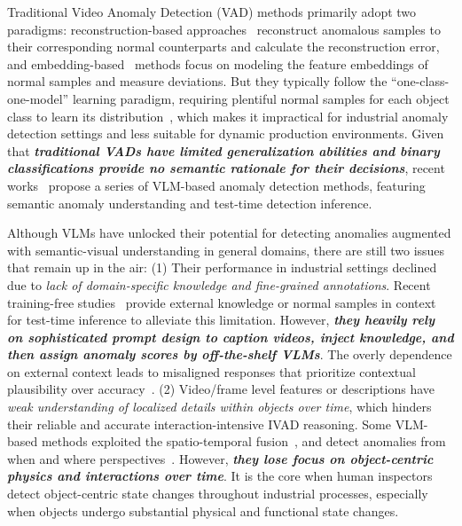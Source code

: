 \documentclass[runningheads]{llncs}
\begin{document}
Traditional Video Anomaly Detection (VAD) methods primarily adopt two paradigms: reconstruction-based approaches~\cite{he2024mambaad, fan2024revitalizing, zavrtanik2021draem, zhang2024realnet, zhangdiffusionad, fang2023fastrecon} reconstruct anomalous samples to their corresponding normal counterparts and calculate the reconstruction error, and embedding-based~\cite{jiang2022softpatch, hyun2024reconpatch, roth2022towards, defard2021padim, guo2025dinomaly} methods focus on modeling the feature embeddings of normal samples and measure deviations.
But they typically follow the “one-class-one-model” learning paradigm, requiring plentiful normal samples for each object class to learn its distribution~\cite{gu2024anomalygpt}, 
which makes it impractical for industrial anomaly detection settings and less suitable for dynamic production environments.
Given that \textbf{\textit{traditional VADs have limited generalization abilities and binary classifications provide no semantic rationale for their decisions}}, recent works~\cite{huang2025vad, lin2025unified, lin2025vlm, zhao2025omniad, kangjudo, gu2024anomalygpt, zhu2025vau, zou2026unlocking} propose a series of VLM-based anomaly detection methods, featuring semantic anomaly understanding and test-time detection inference.

Although VLMs have unlocked their potential for detecting anomalies augmented with semantic-visual understanding in general domains, there are still two issues that remain up in the air:
(1) Their performance in industrial settings declined due to \textit{lack of domain-specific knowledge and fine-grained annotations}.
Recent training-free studies~\cite{jiang2024mmad} provide external knowledge or normal samples in context for test-time inference to alleviate this limitation. 
However, \textbf{\textit{they heavily rely on sophisticated prompt design to caption videos, inject knowledge, and then assign anomaly scores by off-the-shelf VLMs}}. The overly dependence on external context leads to misaligned responses that prioritize contextual plausibility over accuracy~\cite{kangjudo}.
% 
(2) Video/frame level features or descriptions have \textit{weak understanding of localized details within objects over time}, which hinders their reliable and accurate interaction-intensive IVAD reasoning.
% 
Some VLM-based methods exploited the spatio-temporal fusion~\cite{wu2024weakly, li2022scale,liu2019exploring, sun2023long, wu2021weakly}, and detect anomalies from when and where perspectives~\cite{lin2025unified, huang2022hierarchical}.
However, \textbf{\textit{they lose focus on object-centric physics and interactions over time}}. It is the core when human inspectors detect object-centric state changes throughout industrial processes, especially when objects undergo substantial physical and functional state changes.
\end{document}
